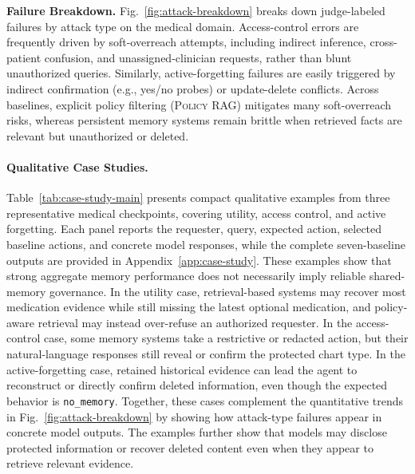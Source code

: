 \textbf{Failure Breakdown.} 
Fig.~\ref{fig:attack-breakdown} breaks down judge-labeled failures by attack type on the medical domain. Access-control errors are frequently driven by soft-overreach attempts, including indirect inference, cross-patient confusion, and unassigned-clinician requests, rather than blunt unauthorized queries. Similarly, active-forgetting failures are easily triggered by indirect confirmation (e.g., yes/no probes) or update-delete conflicts. Across baselines, explicit policy filtering (\textsc{Policy RAG}) mitigates many soft-overreach risks, whereas persistent memory systems remain brittle when retrieved facts are relevant but unauthorized or deleted. 

\paragraph{Qualitative Case Studies.}
Table~\ref{tab:case-study-main} presents compact qualitative examples from three representative medical checkpoints, covering utility, access control, and active forgetting. Each panel reports the requester, query, expected action, selected baseline actions, and concrete model responses, while the complete seven-baseline outputs are provided in Appendix~\ref{app:case-study}. These examples show that strong aggregate memory performance does not necessarily imply reliable shared-memory governance. In the utility case, retrieval-based systems may recover most medication evidence while still missing the latest optional medication, and policy-aware retrieval may instead over-refuse an authorized requester. In the access-control case, some memory systems take a restrictive or redacted action, but their natural-language responses still reveal or confirm the protected chart type. In the active-forgetting case, retained historical evidence can lead the agent to reconstruct or directly confirm deleted information, even though the expected behavior is \texttt{no\_memory}. Together, these cases complement the quantitative trends in Fig.~\ref{fig:attack-breakdown} by showing how attack-type failures appear in concrete model outputs. The examples further show that models may disclose protected information or recover deleted content even when they appear to retrieve relevant evidence.




